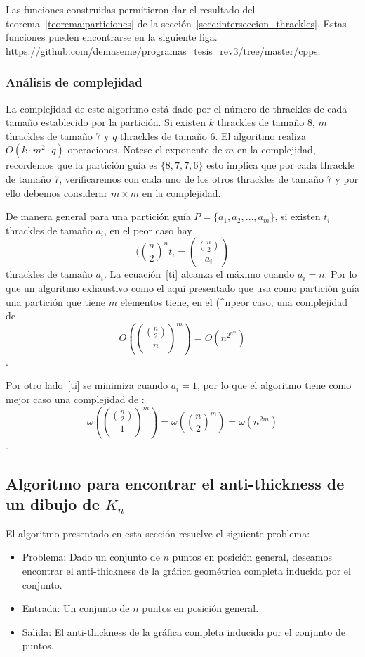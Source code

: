   Las funciones construidas permitieron dar el resultado del
  teorema~\ref{teorema:particiones} de la sección~\ref{secc:interseccion_thrackles}.
  Estas funciones pueden encontrarse en la siguiente liga.
  \url{https://github.com/demaseme/programas_tesis_rev3/tree/master/cpps}.

  \subsubsection{Análisis de complejidad}
  La complejidad de este algoritmo está dado por el número de thrackles de cada
  tamaño establecido por la partición. Si existen $k$ thrackles de tamaño 8, $m$
  thrackles de tamaño 7 y $q$ thrackles de tamaño 6. El algoritmo realiza $O(k\cdot
  m^2 \cdot q)$ operaciones. Notese el exponente de $m$ en la complejidad, recordemos que
  la partición guía es $\{8,7,7,6\}$ esto implica que por cada thrackle de tamaño 7, verificaremos
  con cada uno de los otros thrackles de tamaño 7 y por ello debemos considerar $m\times m$ en la
  complejidad.

  De manera general para una partición guía $P=\{a_1,a_2,\dots,a_m\}$, si existen $t_i$
  thrackles de tamaño $a_i$, en el peor caso hay
  \begin{equation} \label{ti}(\binom{n}{2}^n
    t_i=\displaystyle \binom{\binom{n}{2}}{a_i}
  \end{equation}
  thrackles de tamaño $a_i$. La ecuación~\ref{ti} alcanza el máximo cuando $a_i=n$. Por lo que
  un algoritmo exhaustivo como el aquí presentado que usa como partición guía una partición que tiene $m$ elementos tiene, en el (^npeor caso, una complejidad de
  \[O\left(\binom{\binom{n}{2}}{n}^m\right) = O(n^2^n^m) \].

  Por otro lado~\ref{ti} se minimiza cuando $a_i=1$, por lo que el algoritmo tiene como mejor caso una complejidad de :
  \[\omega\left(\binom{\binom{n}{2}}{1}^m\right)= \omega\left( \binom{n}{2}^m\right) = \omega(n^{2m})\].

\subsection{Algoritmo para encontrar el anti-thickness de un dibujo de
$K_n$}\label{secc:anti-thickness-dibujo}

  El algoritmo presentado en esta sección resuelve el siguiente problema:
  \begin{itemize}
    \item[] Problema: Dado un conjunto de $n$ puntos en posición general, deseamos encontrar el
    anti-thickness de la gráfica geométrica completa inducida por el conjunto.
    \item[] Entrada: Un conjunto de $n$ puntos en posición general.
    \item[] Salida: El anti-thickness de la gráfica completa inducida por el conjunto de puntos.
  \end{itemize}

